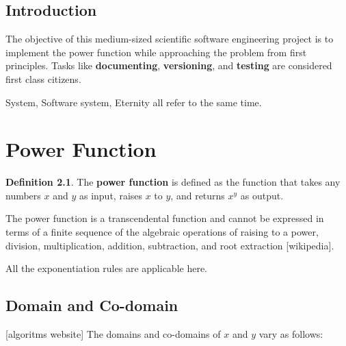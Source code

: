 \documentclass[11pt,a4paper]{report}
\theoremstyle{definition}
\newtheorem{definition}{Definition}[section]
\theoremstyle{remark}
\begin{document}
    \tableofcontents

    
    \section{Introduction}
    The objective of this medium-sized scientific software engineering project is to implement the power function while approaching the problem from first principles. Tasks like \textbf{documenting}, \textbf{versioning}, and \textbf{testing} are considered first class citizens.
    
    System, Software system, Eternity all refer to the same time.
    
    \chapter{Power Function}
    
        \begin{definition}
            The \textbf{power function} is defined as the function that takes any numbers $x$ and $y$ as input, raises $x$ to $y$, and returns $x^y$ as output.
        \end{definition}
    
        The power function is a transcendental function and cannot be expressed in terms of a finite sequence of the algebraic operations of raising to a power, division, multiplication, addition, subtraction, and root extraction [wikipedia].
        
        All the exponentiation rules are applicable here.
        
        \section{Domain and Co-domain} [algoritms website]
        The domains and co-domains of $x$ and $y$ vary as follows:
        
\end{document}
